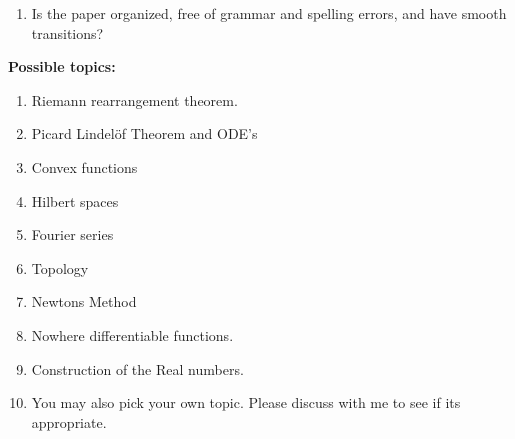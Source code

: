 \documentclass[11pt ]{article}
\theoremstyle{plain}
\begin{document}
\begin{landscape}
\begin{minipage}{.5\textwidth}
\begin{enumerate}[1.]
\begin{enumerate}[$\square$]
\item Is the paper organized, free of grammar and spelling errors, and have smooth transitions?
\end{enumerate}
\end{enumerate}
\end{minipage}
\hspace{2in}
\begin{minipage}{.5\textwidth}
{\bf \Large Possible topics:}
\begin{enumerate}[1.]
\item Riemann rearrangement theorem. 
\item Picard Lindel\"{o}f Theorem and ODE's
\item Convex functions
\item Hilbert spaces
\item Fourier series
\item Topology 
\item Newtons Method
\item Nowhere differentiable functions. 
\item Construction of the Real numbers. 
\item You may also pick your own topic. Please discuss with me to see if its appropriate.
\end{enumerate}
\end{minipage}
\end{landscape}
\end{document}
